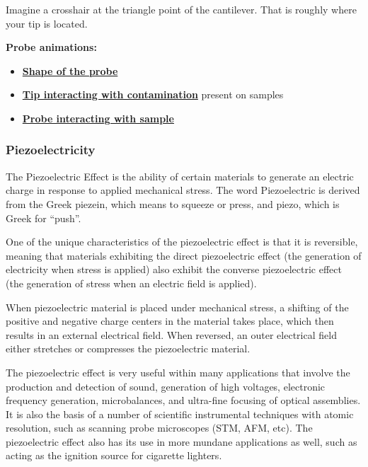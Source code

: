 \documentclass{../lab}
\begin{document}
Imagine a crosshair at the triangle point of the cantilever. That is roughly where your tip is located.

\textbf{Probe animations:}

\begin{itemize}
    \item \href{http://experimentationlab.berkeley.edu/sites/default/files/AFMImages/5.2.\%20Probe\%20Shape\%20-\%20Hole.flv\_converted.mp4}{\textbf{Shape of the probe}}

    \item \href{http://experimentationlab.berkeley.edu/sites/default/files/AFMImages/5.1\%20Contamination.flv\_converted.mp4}{\textbf{Tip interacting with contamination}} present on samples

    \item \href{http://experimentationlab.berkeley.edu/sites/default/files/AFMImages/5.3.\%20Probe\%20Sample\%20Bump.flv\_converted.mp4}{\textbf{Probe interacting with sample}}

\end{itemize}

\subsubsection{Piezoelectricity}
\label{subsubsec:Piezo}

The Piezoelectric Effect is the ability of certain materials to generate an electric charge in response to applied mechanical stress. The word Piezoelectric is derived from the Greek piezein, which means to squeeze or press, and piezo, which is Greek for “push”.

One of the unique characteristics of the piezoelectric effect is that it is reversible, meaning that materials exhibiting the direct piezoelectric effect (the generation of electricity when stress is applied) also exhibit the converse piezoelectric effect (the generation of stress when an electric field is applied).

When piezoelectric material is placed under mechanical stress, a shifting of the positive and negative charge centers in the material takes place, which then results in an external electrical field. When reversed, an outer electrical field either stretches or compresses the piezoelectric material.

The piezoelectric effect is very useful within many applications that involve the production and detection of sound, generation of high voltages, electronic frequency generation, microbalances, and ultra-fine focusing of optical assemblies. It is also the basis of a number of scientific instrumental techniques with atomic resolution, such as scanning probe microscopes (STM, AFM, etc). The piezoelectric effect also has its use in more mundane applications as well, such as acting as the ignition source for cigarette lighters. 
\end{document}
